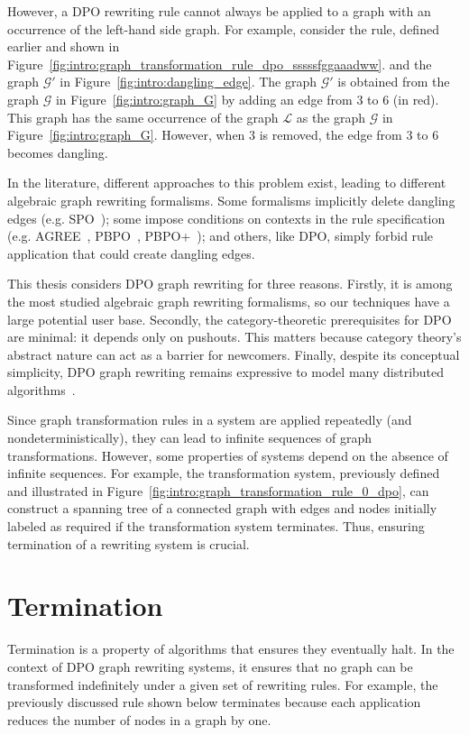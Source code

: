 However, a DPO rewriting rule cannot always be applied to a graph with an occurrence of the left-hand side graph.
For example, consider the rule, defined earlier and shown in Figure~\ref{fig:intro:graph_transformation_rule_dpo_sssssfggaaadww}. and the graph $\mathcal{G}'$ in Figure~\ref{fig:intro:dangling_edge}. The graph $\mathcal{G}'$ is obtained from the graph $\mathcal{G}$ in Figure~\ref{fig:intro:graph_G} by adding an edge from $3$ to $6$ (in red). This graph has the same occurrence of the graph $\mathcal{L}$ as the graph $\mathcal{G}$ in Figure~\ref{fig:intro:graph_G}.
However, when $3$ is removed, the edge from $3$ to $6$ becomes dangling.

In the literature, different approaches to this problem exist, leading to different algebraic graph rewriting formalisms. Some formalisms implicitly delete dangling edges (e.g. SPO~\cite{ehrig1997algebraic}); 
some impose conditions on contexts in the rule specification (e.g. AGREE~\cite{corradini2015agree}, PBPO~\cite{corradini2019thepbpo}, PBPO+~\cite{overbeek2023graph}); and others, like DPO, simply forbid rule application that could create dangling edges.

   This thesis considers DPO graph rewriting for three reasons.
   Firstly, it is among the most studied algebraic graph rewriting formalisms, so our techniques have a large potential user base.
   Secondly, the category-theoretic prerequisites for DPO are minimal: it depends only on pushouts. This matters because category theory's abstract nature can act as a barrier for newcomers.
    Finally, despite its conceptual simplicity, DPO graph rewriting remains expressive to model many distributed algorithms~\cite{ehrig2006fundamentals,corradini1997algebraic}.
    
Since graph transformation rules in a system are applied repeatedly (and nondeterministically), they can lead to infinite sequences of graph transformations. However, some properties of systems depend on the absence of infinite sequences. For example, the transformation system, previously defined and illustrated in Figure~\ref{fig:intro:graph_transformation_rule_0_dpo}, can construct a spanning tree of a connected graph with edges and nodes initially labeled as required if the transformation system terminates. Thus, ensuring termination of a rewriting system is crucial.

\section{Termination} 
Termination is a property of algorithms that ensures they eventually halt. In the context of DPO graph rewriting systems, it ensures that no graph can be transformed indefinitely under a given set of rewriting rules. 
For example, the previously discussed rule shown below terminates because each application reduces the number of nodes in a graph by one.

